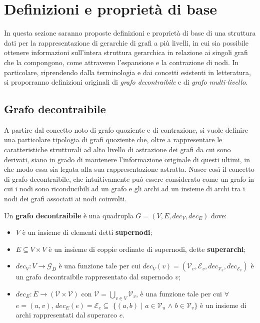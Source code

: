 \section{Definizioni e propriet\`a di base}\label{sec:definizioni-e-proprieta-di-base}

In questa sezione saranno proposte definizioni e propriet\`a di base di una struttura dati per la rappresentazione
di gerarchie di grafi a pi\`u livelli, in cui sia possibile ottenere informazioni sull'intera struttura gerarchica in
relazione ai singoli grafi che la compongono, come attraverso l'espansione e la contrazione di nodi.
In particolare, riprendendo dalla terminologia e dai concetti esistenti in letteratura, si proporranno definizioni
originali di \textit{grafo decontraibile} e di \textit{grafo multi-livello}.

\subsection{Grafo decontraibile}

A partire dal concetto noto di grafo quoziente e di contrazione, si vuole definire una particolare
tipologia di grafi quoziente che, oltre a rappresentare le caratteristiche strutturali ad alto livello di astrazione
dei grafi da cui sono derivati, siano in grado di mantenere l'informazione originale di questi ultimi, in
che modo essa sia legata alla sua rappresentazione astratta. \newline
Nasce così il concetto di grafo decontraibile, che intuitivamente pu\`o essere considerato come un grafo
in cui i nodi sono riconducibili ad un grafo e gli archi ad un insieme di archi tra i nodi dei grafi
associati ai nodi coinvolti.
\newpage

\begin{definition}
    Un \textbf{grafo decontraibile} \`e una quadrupla $G = (V, E, dec_V, dec_E)$ dove:
    \begin{itemize}
        \item $V$ \`e un insieme di elementi detti \textbf{supernodi};
        \item $E \subseteq V \times V$ \`e un insieme di coppie ordinate di supernodi, dette \textbf{superarchi};
        \item $dec_V : V \rightarrow \mathcal{G}_D$ \`e una funzione tale per cui $dec_V(v) = (\mathcal{V}_v,
            \mathcal{E}_v, dec_{\mathcal{V}_v}, dec_{\mathcal{E}_v})$ \`e un grafo decontraibile rappresentato
            dal supernodo $v$;
        \item $dec_E : E \rightarrow (\mathcal{V} \times \mathcal{V})$ con $\mathcal{V} = \bigcup_{v \in V}\mathcal{V}_v$,
            \`e una funzione tale per cui $\forall$ $ e = (u, v)$, $dec_E(e) = \mathcal{E}_e \subseteq$ $\{(a, b)$ $\mid$ $a \in \mathcal{V}_u$ $\wedge$
            $b \in \mathcal{V}_v\}$ \`e un insieme di archi rappresentati dal superarco $e$.
    \end{itemize}
\end{definition}


